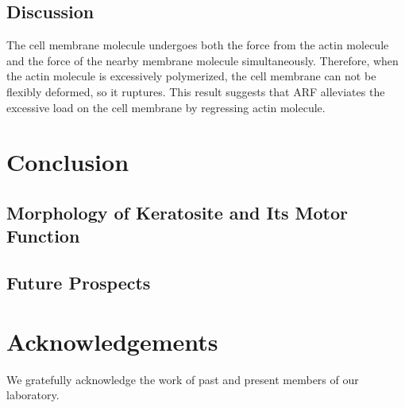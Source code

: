 \documentclass[a4paper,12pt]{book}
\begin{document}
\section{Discussion}
The cell membrane molecule undergoes both the force from the actin molecule and the force of the nearby membrane molecule simultaneously. Therefore, when the actin molecule is excessively polymerized, the cell membrane can not be flexibly deformed, so it ruptures. This result suggests that ARF alleviates the excessive load on the cell membrane by regressing actin molecule.

\chapter{Conclusion}
\section{Morphology of Keratosite and Its Motor Function}

\section{Future Prospects}

\chapter*{Acknowledgements}
We gratefully acknowledge the work of past and present members of our laboratory.




\end{document}
